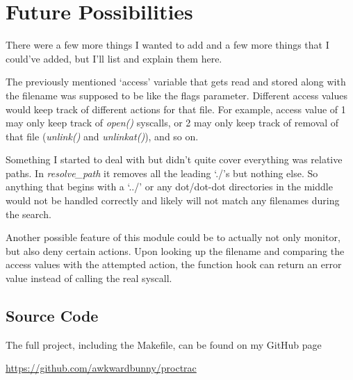 \documentclass[letterpaper,12pt]{article}
\begin{document}
\section{Future Possibilities}

There were a few more things I wanted to add and a few more things that I could've added, but I'll list and explain them here.

The previously mentioned `access' variable that gets read and stored along with the filename was supposed to be like the flags parameter. Different access values would keep track of different actions for that file. For example, access value of 1 may only keep track of \textit{open()} syscalls, or 2 may only keep track of removal of that file (\textit{unlink()} and \textit{unlinkat()}), and so on.

Something I started to deal with but didn't quite cover everything was relative paths. In \textit{resolve\_path} it removes all the leading `./'s but nothing else. So anything that begins with a `../' or any dot/dot-dot directories in the middle would not be handled correctly and likely will not match any filenames during the search.

Another possible feature of this module could be to actually not only monitor, but also deny certain actions. Upon looking up the filename and comparing the access values with the attempted action, the function hook can return an error value instead of calling the real syscall.

\begin{appendices}
\section{Source Code}
The full project, including the Makefile, can be found on my GitHub page

\url{https://github.com/awkwardbunny/proctrac}

\end{appendices}
\end{document}
